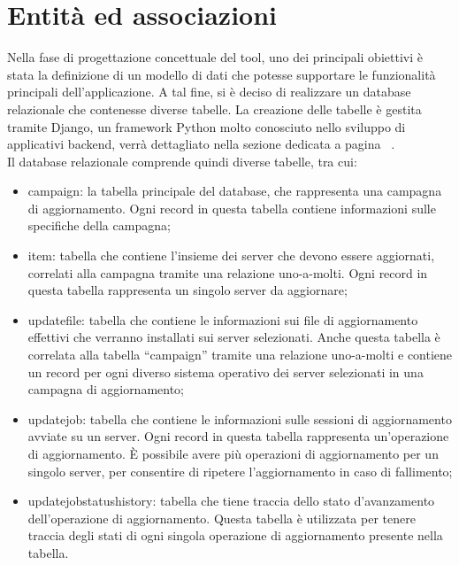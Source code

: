 \section{Entità ed associazioni}
Nella fase di progettazione concettuale del tool, uno dei principali
obiettivi è stata la definizione di un modello di dati che potesse 
supportare le funzionalità principali dell'applicazione.
A tal fine, si è deciso di realizzare un database relazionale che 
contenesse diverse tabelle. La creazione delle tabelle è gestita 
tramite Django, un framework Python molto conosciuto nello sviluppo di 
applicativi backend, verrà dettagliato nella sezione dedicata a 
pagina ~\pageref{subsec:Django}.\\

\noindent Il database relazionale comprende quindi diverse tabelle, tra cui:
\begin{itemize}
\item campaign: la tabella principale del database, che rappresenta una 
campagna di aggiornamento. Ogni record in questa tabella contiene 
informazioni sulle specifiche della campagna;
\item item: tabella che contiene l'insieme dei server che devono essere 
aggiornati, correlati alla campagna tramite una relazione uno-a-molti. 
Ogni record in questa tabella rappresenta un singolo server da aggiornare;
\item updatefile: tabella che contiene le informazioni sui file di aggiornamento 
effettivi che verranno installati sui server selezionati. 
Anche questa tabella è correlata alla tabella “campaign” tramite una 
relazione uno-a-molti e contiene un record per ogni diverso sistema 
operativo dei server selezionati in una campagna di aggiornamento;
\item updatejob: tabella che contiene le informazioni sulle sessioni 
di aggiornamento avviate su un server. Ogni record in questa tabella 
rappresenta un'operazione di aggiornamento. È possibile avere più operazioni 
di aggiornamento per un singolo server, per consentire di ripetere 
l’aggiornamento in caso di fallimento;
\item updatejobstatushistory: tabella che tiene traccia dello stato d'avanzamento 
dell’operazione di aggiornamento. Questa tabella è utilizzata 
per tenere traccia degli stati di ogni singola operazione di aggiornamento 
presente nella tabella.
\end{itemize}

